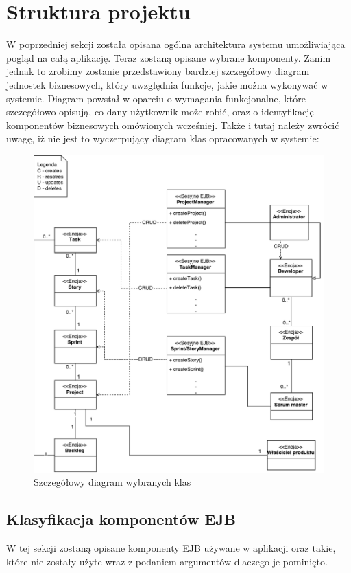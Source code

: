 \section{Struktura projektu}
W poprzedniej sekcji została opisana ogólna architektura systemu umożliwiająca pogląd na całą aplikację. Teraz zostaną opisane wybrane komponenty. Zanim jednak to zrobimy zostanie przedstawiony bardziej szczegółowy diagram jednostek biznesowych, który uwzględnia funkcje, jakie można wykonywać w systemie. Diagram powstał w oparciu o wymagania funkcjonalne, które szczegółowo opisują, co dany użytkownik może robić, oraz o identyfikację komponentów biznesowych omówionych wcześniej. Także i tutaj należy zwrócić uwagę, iż nie jest to wyczerpujący diagram klas opracowanych w systemie:
\begin{figure}[h!]
	\centering
	\includegraphics[width=15cm]{rysunki/diagdetailuml.pdf}	
	\caption{Szczegółowy diagram wybranych klas}
	\label{fig:diagdetailuml}
\end{figure}

\subsection{Klasyfikacja komponentów EJB}
W tej sekcji zostaną opisane komponenty EJB używane w aplikacji oraz takie, które nie zostały użyte wraz z podaniem argumentów dlaczego je pominięto.

